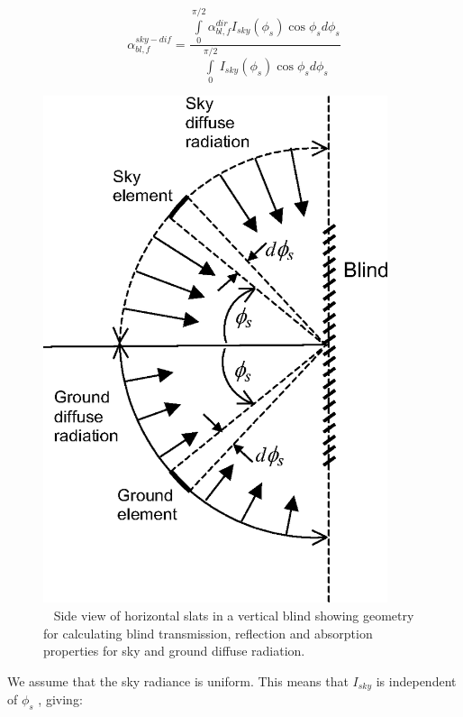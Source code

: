 \begin{equation}
\alpha_{bl,f}^{sky - dif} = \frac{{\int\limits_0^{\pi /2} {\alpha_{bl,f}^{dir}{I_{sky}}({\phi_s})\cos {\phi_s}d{\phi_s}} }}{{\int\limits_0^{\pi /2} {{I_{sky}}({\phi_s})\cos {\phi_s}d{\phi_s}} }}
\end{equation}

\begin{figure}[hbtp] %
\centering
\includegraphics[width=0.9\textwidth, height=0.9\textheight, keepaspectratio=true]{media/image1090.png}
\caption{  Side view of horizontal slats in a vertical blind showing geometry for calculating blind transmission, reflection and absorption properties for sky and ground diffuse radiation. \protect \label{fig:side-view-of-horizontal-slats-in-a-vertical}}
\end{figure}

We assume that the sky radiance is uniform. This means that \({I_{sky}}\) is independent of \({\phi_s}\) , giving:

